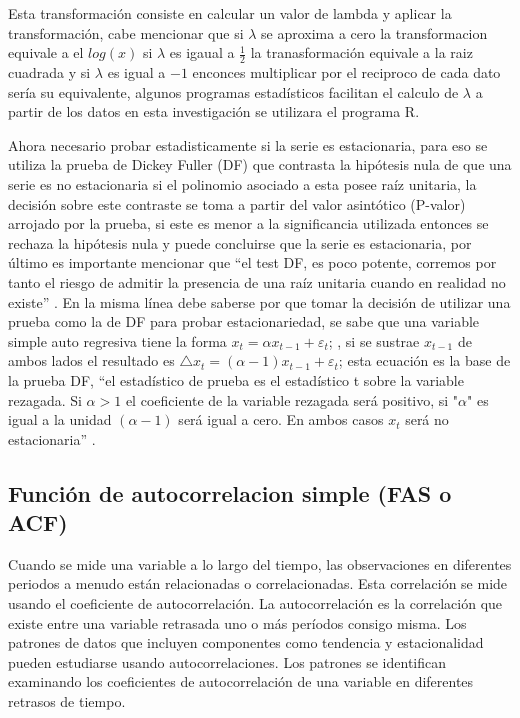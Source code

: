 \documentclass[12pt,letterpaper]{report}
\begin{document}
Esta transformación consiste en calcular un valor de lambda y aplicar la transformación, cabe mencionar que si $\lambda$ se aproxima a cero la transformacion equivale a el $log(x)$ si $\lambda$ es igaual a $\frac{1}{2}$ la tranasformación equivale a la raiz cuadrada y si $\lambda$ es igual a $-1$ enconces multiplicar por el reciproco de cada dato sería su equivalente, algunos programas estadísticos facilitan el calculo de $\lambda$ a partir de los datos en esta investigación se utilizara el programa R.\cite{Cryer}

Ahora necesario probar estadisticamente si la serie es estacionaria, para eso se utiliza la prueba de Dickey Fuller (DF) que contrasta la hipótesis nula de que una serie es no estacionaria si el polinomio asociado a esta posee raíz unitaria, la decisión sobre este contraste se toma a partir del valor asintótico (P-valor) arrojado por la prueba, si este es menor a la significancia utilizada entonces se rechaza la hipótesis nula y puede concluirse que la serie es estacionaria, por último es importante mencionar que “el test DF, es poco potente, corremos por tanto el riesgo de admitir la presencia de una raíz unitaria cuando en realidad no existe” \cite{Ramon}. En la misma línea debe saberse por que tomar la decisión de utilizar una prueba como la de DF para probar estacionariedad, se sabe que una variable simple auto regresiva tiene la forma $x_t=\alpha x_{t-1}+\varepsilon_t$; \cite{Daniel2001}, si se sustrae $x_{t-1}$ de ambos lados el resultado es $\triangle x_t=(\alpha-1) x_{t-1}+\varepsilon_t$; esta ecuación es la base de la prueba DF, “el estadístico de prueba es el estadístico t sobre la variable rezagada. Si $\alpha>1$ el coeficiente de la variable rezagada será positivo, si "$\alpha$" es igual a la unidad $(\alpha-1)$ será igual a cero. En ambos casos $x_t$ será no estacionaria” \cite{Commandeur2007}.

\subsection{Función de autocorrelacion simple (FAS o ACF)}

Cuando se mide una variable a lo largo del tiempo, las observaciones en
diferentes periodos a menudo están relacionadas o correlacionadas. Esta correlación se mide usando el coeficiente de autocorrelación. La autocorrelación
es la correlación que existe entre una variable retrasada uno o más períodos
consigo misma.
Los patrones de datos que incluyen componentes como tendencia y estacionalidad pueden estudiarse usando autocorrelaciones. Los patrones se identifican
examinando los coeficientes de autocorrelación de una variable en diferentes
retrasos de tiempo.
\end{document}
